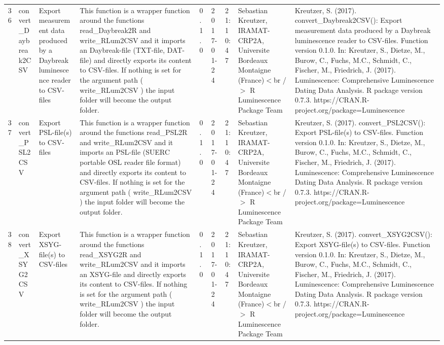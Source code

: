 \begin{table}[ht]
\begin{tabular}{rllllllll}
 \\ 
  36 & convert\_Daybreak2CSV & Export measurement data produced by a Daybreak luminescence reader to CSV-files & This function is a wrapper function around the functions  read\_Daybreak2R  and write\_RLum2CSV  and it imports an Daybreak-file (TXT-file, DAT-file) and directly exports its content to CSV-files.  If nothing is set for the argument  path  ( write\_RLum2CSV ) the input folder will become the output folder. & 0.1.0 & 2017-01-24 & 21:10:47
 & Sebastian Kreutzer, IRAMAT-CRP2A, Universite Bordeaux Montaigne (France)$<$br /$>$  R Luminescence Package Team & Kreutzer, S. (2017). convert\_Daybreak2CSV(): Export measurement data produced by a Daybreak luminescence reader to CSV-files. Function version 0.1.0. In: Kreutzer, S., Dietze, M., Burow, C., Fuchs, M.C., Schmidt, C., Fischer, M., Friedrich, J. (2017). Luminescence: Comprehensive Luminescence Dating Data Analysis. R package version 0.7.3. https://CRAN.R-project.org/package=Luminescence
 \\ 
  37 & convert\_PSL2CSV & Export PSL-file(s) to CSV-files & This function is a wrapper function around the functions  read\_PSL2R  and write\_RLum2CSV  and it imports an PSL-file (SUERC portable OSL reader file format) and directly exports its content to CSV-files. If nothing is set for the argument  path  ( write\_RLum2CSV ) the input folder will become the output folder. & 0.1.0 & 2017-01-24 & 21:10:47
 & Sebastian Kreutzer, IRAMAT-CRP2A, Universite Bordeaux Montaigne (France)$<$br /$>$  R Luminescence Package Team & Kreutzer, S. (2017). convert\_PSL2CSV(): Export PSL-file(s) to CSV-files. Function version 0.1.0. In: Kreutzer, S., Dietze, M., Burow, C., Fuchs, M.C., Schmidt, C., Fischer, M., Friedrich, J. (2017). Luminescence: Comprehensive Luminescence Dating Data Analysis. R package version 0.7.3. https://CRAN.R-project.org/package=Luminescence
 \\ 
  38 & convert\_XSYG2CSV & Export XSYG-file(s) to CSV-files & This function is a wrapper function around the functions  read\_XSYG2R  and write\_RLum2CSV  and it imports an XSYG-file and directly exports its content to CSV-files. If nothing is set for the argument  path  ( write\_RLum2CSV ) the input folder will become the output folder. & 0.1.0 & 2017-01-24 & 21:10:47
 & Sebastian Kreutzer, IRAMAT-CRP2A, Universite Bordeaux Montaigne (France)$<$br /$>$  R Luminescence Package Team & Kreutzer, S. (2017). convert\_XSYG2CSV(): Export XSYG-file(s) to CSV-files. Function version 0.1.0. In: Kreutzer, S., Dietze, M., Burow, C., Fuchs, M.C., Schmidt, C., Fischer, M., Friedrich, J. (2017). Luminescence: Comprehensive Luminescence Dating Data Analysis. R package version 0.7.3. https://CRAN.R-project.org/package=Luminescence

\end{tabular}
\end{table}
